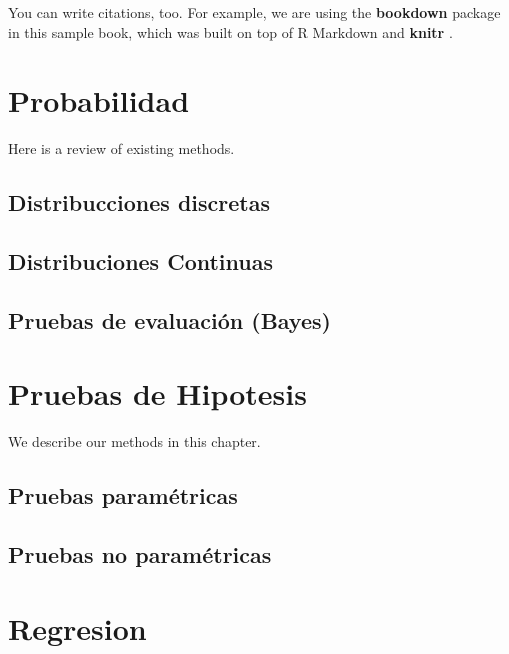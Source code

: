 \documentclass[
]{book}
\begin{document}
You can write citations, too. For example, we are using the \textbf{bookdown} package \citep{R-bookdown} in this sample book, which was built on top of R Markdown and \textbf{knitr} \citep{xie2015}.

\hypertarget{probabilidad}{%
\chapter{Probabilidad}\label{probabilidad}}

Here is a review of existing methods.

\hypertarget{distribucciones-discretas}{%
\section{Distribucciones discretas}\label{distribucciones-discretas}}

\hypertarget{distribuciones-continuas}{%
\section{Distribuciones Continuas}\label{distribuciones-continuas}}

\hypertarget{pruebas-de-evaluaciuxf3n-bayes}{%
\section{Pruebas de evaluación (Bayes)}\label{pruebas-de-evaluaciuxf3n-bayes}}

\hypertarget{pruebas-de-hipotesis}{%
\chapter{Pruebas de Hipotesis}\label{pruebas-de-hipotesis}}

We describe our methods in this chapter.

\hypertarget{pruebas-paramuxe9tricas}{%
\section{Pruebas paramétricas}\label{pruebas-paramuxe9tricas}}

\hypertarget{pruebas-no-paramuxe9tricas}{%
\section{Pruebas no paramétricas}\label{pruebas-no-paramuxe9tricas}}

\hypertarget{regresion}{%
\chapter{Regresion}\label{regresion}}
\end{document}
